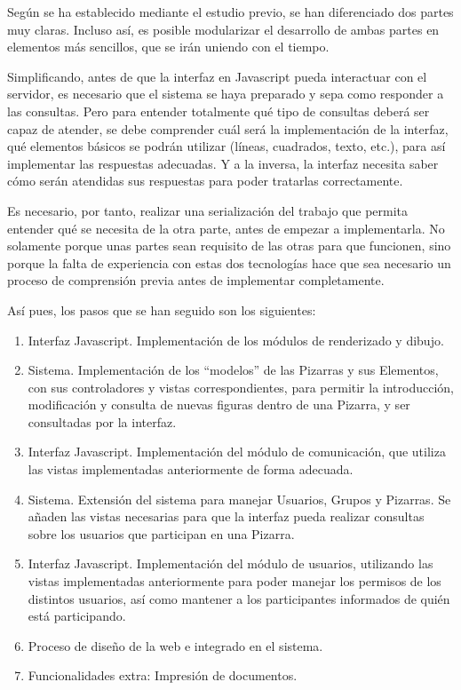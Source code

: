Según se ha establecido mediante el estudio previo, se han diferenciado dos partes muy claras. Incluso así, es posible modularizar el desarrollo de ambas partes en elementos más sencillos, que se irán uniendo con el tiempo.

Simplificando, antes de que la interfaz en Javascript pueda interactuar con el servidor, es necesario que el sistema se haya preparado y sepa como responder a las consultas. Pero para entender totalmente qué tipo de consultas deberá ser capaz de atender, se debe comprender cuál será la implementación de la interfaz, qué elementos básicos se podrán utilizar (líneas, cuadrados, texto, etc.), para así implementar las respuestas adecuadas. Y a la inversa, la interfaz necesita saber cómo serán atendidas sus respuestas para poder tratarlas correctamente.

Es necesario, por tanto, realizar una serialización del trabajo que permita entender qué se necesita de la otra parte, antes de empezar a implementarla. No solamente porque unas partes sean requisito de las otras para que funcionen, sino porque la falta de experiencia con estas dos tecnologías hace que sea necesario un proceso de comprensión previa antes de implementar completamente.

Así pues, los pasos que se han seguido son los siguientes:

\begin{enumerate}
	\item Interfaz Javascript. Implementación de los módulos de renderizado y dibujo.
	\item Sistema. Implementación de los ``modelos'' de las Pizarras y sus Elementos, con	sus controladores y vistas correspondientes, para permitir la introducción, modificación y consulta de nuevas figuras dentro de una Pizarra, y ser consultadas por la interfaz.
	\item Interfaz Javascript. Implementación del módulo de comunicación, que utiliza las vistas implementadas anteriormente de forma adecuada.
	\item Sistema. Extensión del sistema para manejar Usuarios, Grupos y Pizarras. Se añaden las vistas necesarias para que la interfaz pueda realizar consultas sobre los usuarios que participan en una Pizarra.
	\item Interfaz Javascript. Implementación del módulo de usuarios, utilizando las vistas implementadas anteriormente para poder manejar los permisos de los distintos usuarios, así como mantener a los participantes informados de quién está participando.
	\item Proceso de diseño de la web e integrado en el sistema.
	\item Funcionalidades extra: Impresión de documentos.
\end{enumerate}

